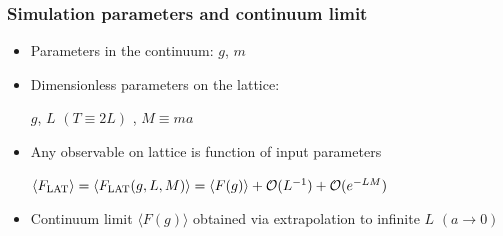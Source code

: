 \documentclass{beamer}
\begin{document}
\begin{frame}
\frametitle{Simulation parameters and continuum limit}
\begin{itemize}
\item Parameters in the continuum: $g$, $m$
\item Dimensionless parameters on the lattice:\\
\begin{center}
$g$, $L$ $(T\equiv 2L)$ , $M\equiv ma$
\end{center}
\item Any observable on lattice is function of input parameters\\
\begin{center}
$\langle F_{\rm LAT} \rangle = \langle F_{\rm LAT}(g,L,M) \rangle = \langle F(g) \rangle + \mathcal{O}(L^{-1}) + \mathcal{O}(e^{-LM})$
\end{center}
\item Continuum limit $\langle F(g) \rangle$ obtained via extrapolation to infinite $L$ $(a\to 0)$
\end{itemize}
\end{frame}

\end{document}
